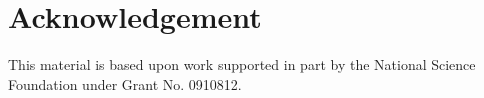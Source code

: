 \documentclass{sig-alternate}
\begin{document}
\section{Acknowledgement} 
 
This material is based upon work supported in part by the National Science Foundation under Grant No. 0910812.
 
 
 
% 


 
\end{document}

